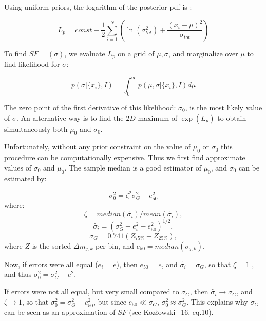 \documentclass[fleqn,usenatbib]{mnras}  %
\begin{document}
Using uniform priors, the logarithm of the posterior pdf is :

\begin{equation}
\label{eq:logP}
L_{p} = const - \frac{1}{2} \sum_{i=1}^{N} {\left( \ln{(\sigma_{tot}^{2})} + \frac{(x_{i}-\mu)^{2}}{\sigma_{tot}} \right) }
\end{equation}

To find $SF = (\sigma)$, we evaluate $L_{p}$ on a grid of $\mu, \sigma$, and marginalize over $\mu$ to find likelihood for $\sigma$:  

\begin{equation}
p(\sigma|\{ x_{i}\}, I) = \int_{0}^{\infty} {p(\mu,\sigma |\{ x_{i}\}, I )} d \mu
\end{equation}

The zero point of the first derivative of this likelihood: $\sigma_{0}$,  is the most likely value of $\sigma$. An alternative way is to find the $2D$ maximum of $\exp{(L_{p})}$ to obtain simultaneously both $\mu_{0}$ and $\sigma_{0}$.

Unfortunately, without any prior constraint on the value of $\mu_{0}$ or $\sigma_{0}$ this procedure can be  computationally expensive. Thus we first find  approximate values of  $\sigma_{0}$ and $\mu_{0}$.  The sample median is a good estimator of $\mu_{0}$, and $\sigma_{0}$ can be estimated by:

\begin{equation}
\sigma_{0}^{2} = \zeta^{2} \sigma_{G}^{2} - e_{50}^{2}
\end{equation} 
where:
\begin{equation}
\zeta = median(\tilde{\sigma_{i}}) / mean(\tilde{\sigma_{i}}),
\end{equation} 
\begin{equation}
\tilde{\sigma_{i}} = (\sigma_{G}^{2} + e_{i}^{2} - e_{50}^{2})^{1/2},
\end{equation}
\begin{equation}
\sigma_{G} = 0.741 (Z_{75\%} - Z_{25\%}), 
\end{equation}
where $Z$ is the sorted $\Delta m_{j,k}$ per bin, and $e_{50} = median(\sigma_{j,k})$.

Now, if errors were all equal ($e_{i} = e$), then $e_{50} = e$, and $\tilde{\sigma_{i}}= \sigma_{G}$, so that $\zeta=1$ , and thus $\sigma_{0}^{2} = \sigma_{G}^{2} - e^{2}$. 

If errors were not all equal, but very small compared to $\sigma_{G}$, then $\tilde{\sigma_{i}} \to \sigma_{G}$, and $\zeta \to 1$, so that  $\sigma_{0}^{2} = \sigma_{G}^{2} - e_{50}^{2}$, but since $e_{50} \ll \sigma_{G}$,  $\sigma_{0}^{2} \approx \sigma_{G}^{2}$. This explains why $\sigma_{G}$ can be seen as an approximation of $SF$ (see Koz\l{}owski+16, eq.10). 
\end{document}
